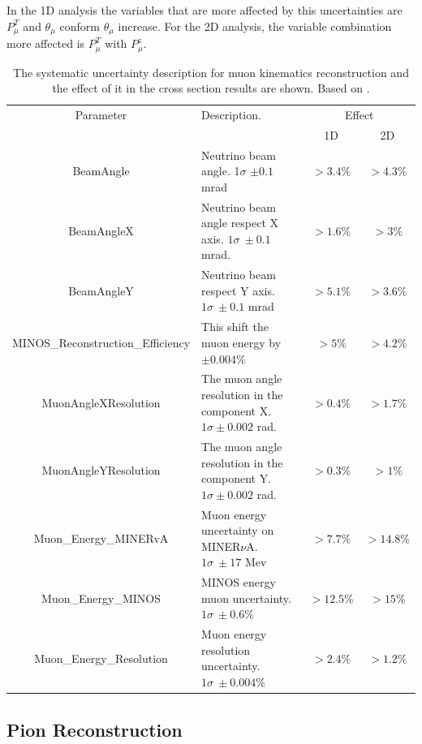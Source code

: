 In the 1D analysis the variables that are more affected by this uncertainties are $P^T_\mu$ and $\theta_\mu$ conform $\theta_\mu$ increase. For the 2D analysis, the variable combination more affected is $P^T_\mu$ with $P^z_\mu$.  
\begin{table}[!htb]
    \centering
    \begin{tabular}{c|p{2in}|c|c}
        \hline 
        Parameter & Description.  & \multicolumn{2}{c}{Effect} \\
         & & 1D & 2D \\
        \hline  
        BeamAngle & Neutrino beam angle. 1$\sigma$ $\pm0.1$ mrad   & $>3.4\%$ & $>4.3\%$\\ \hline
        BeamAngleX & Neutrino beam angle respect X axis. $1\sigma\ \pm0.1$ mrad. & $>1.6\%$ & $>3\%$ \\ \hline
        BeamAngleY & Neutrino beam respect Y axis. $1\sigma\ \pm0.1$ mrad & $>5.1\%$ & $>3.6\%$ \\ \hline
        MINOS\_Reconstruction\_Efficiency & This shift the muon energy by $\pm0.004\%$ & $>5\%$ & $>4.2\%$\\ \hline
        MuonAngleXResolution & The muon angle resolution in the component X. $1\sigma \pm0.002$ rad.  & $>0.4\%$ & $>1.7\%$ \\ \hline
        MuonAngleYResolution & The muon angle resolution in the component Y. $1\sigma \pm0.002$ rad. & $>0.3\%$ & $>1\%$ \\ \hline
        Muon\_Energy\_MINERvA & Muon energy uncertainty on MINER$\nu$A. $1\sigma\ \pm17$ Mev & $>7.7\%$ & $>14.8\%$\\ \hline
        Muon\_Energy\_MINOS & MINOS energy muon uncertainty. $1\sigma\ \pm0.6\%$  & $>12.5\%$ & $>15\%$ \\ \hline
        Muon\_Energy\_Resolution & Muon energy resolution uncertainty. $1\sigma\ \pm0.004\%$ & $>2.4\%$ & $>1.2\%$ \\ \hline
    \end{tabular}
    \caption{The systematic uncertainty description for muon kinematics reconstruction and the effect of it in the cross section results are shown. Based on \cite{AmitBashyal:2021tzd}.}
    \label{tab:ErrorAnalysis:SystematicUnc:Muon}
\end{table}



\pagebreak
\subsection{Pion Reconstruction}
\label{Cap:ErrorAnalysis:SystematicUnc:PionReco}


